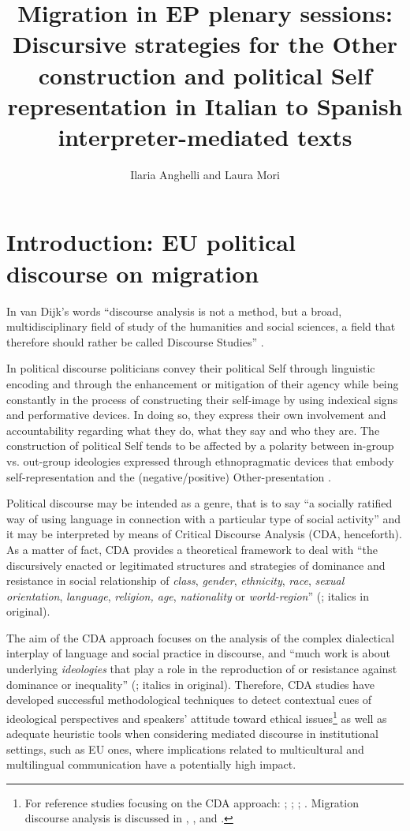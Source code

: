 \documentclass[output=paper]{langscibook}
\author{Ilaria Anghelli\orcid{}\affiliation{Centro ricerche INAIL} and Laura Mori\orcid{}\affiliation{Università degli Studi Internazionali di Roma - UNINT}}
\title[Migration in EP plenary sessions]{Migration in EP plenary sessions: Discursive strategies for the Other construction and political Self representation in Italian to Spanish interpreter-mediated texts}
\begin{document}
\maketitle



\section{Introduction: EU political discourse on migration}\label{sec:mori:1}
\largerpage
In van Dijk’s words “discourse analysis is not a method, but a broad, multidisciplinary field of study of the humanities and social sciences, a field that therefore should rather be called Discourse Studies” \citep[227]{VanDijk2018}. 

In political discourse politicians convey their political Self through linguistic encoding and through the enhancement or mitigation of their agency while being constantly in the process of constructing their self-image by using indexical signs and performative devices. In doing so, they express their own involvement and accountability regarding what they do, what they say and who they are. The construction of political Self tends to be affected by a polarity between in-group vs. out-group ideologies expressed through ethnopragmatic devices that embody self-representation and the (negative/positive) Other-presentation \citep{Duranti2006}. 

Political discourse may be intended as a genre, that is to say “a socially ratified way of using language in connection with a particular type of social activity” \citep[14]{Fairclough1995} and it may be interpreted by means of Critical Discourse Analysis (CDA, henceforth). As a matter of fact, CDA provides a theoretical framework to deal with “the discursively enacted or legitimated structures and strategies of dominance and resistance in social relationship of \textit{class}, \textit{gender}, \textit{ethnicity}, \textit{race}, \textit{sexual orientation}, \textit{language}, \textit{religion, age}, \textit{nationality} or \textit{world-region}” (\citealt[18]{VanDijk1995}; italics in original).

The aim of the CDA approach focuses on the analysis of the complex dialectical interplay of language and social practice in discourse, and “much work is about underlying \textit{ideologies} that play a role in the reproduction of or resistance against dominance or inequality” (\citealt[18]{VanDijk1995}; italics in original). Therefore, CDA studies have developed successful methodological techniques to detect contextual cues of ideological perspectives and speakers’ attitude toward ethical issues\footnote{For reference studies focusing on the CDA approach: \citet{Wodak1996, Wodak2001, Wodak2015}; \citet{WodakVanDijk2000}; \citet{ReisiglWodak2001}; \citet{VanDijk1995, VanDijk2001, VanDijk2006ideology}. Migration discourse analysis is discussed in \citet{RojoVanDijk1997}, \citet{WodakVanDijk2000}, and \citet{Wodak2015}.} as well as adequate heuristic tools when considering mediated discourse in institutional settings, such as EU ones, where implications related to multicultural and multilingual communication have a potentially high impact. 
\end{document}
